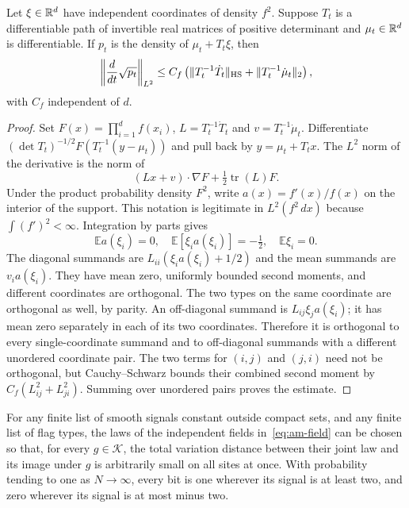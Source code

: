 \begin{lemma}\label{lem:am-density-speed}
Let $\xi\in\mathbb R^d$ have independent coordinates of density $f^2$.  Suppose
$T_t$ is a differentiable path of invertible real matrices of positive
determinant and $\mu_t\in\mathbb R^d$ is differentiable.  If $p_t$ is the density
of $\mu_t+T_t\xi$, then
\[
 \left\|\frac{d}{dt}\sqrt{p_t}\right\|_{L^2}
 \le C_f\left(\|T_t^{-1}\dot T_t\|_{\mathrm{HS}}
                  +\|T_t^{-1}\dot\mu_t\|_2\right),
\]
with $C_f$ independent of $d$.
\end{lemma}

\begin{proof}
Set $F(x)=\prod_{i=1}^d f(x_i)$,
$L=T_t^{-1}\dot T_t$ and $v=T_t^{-1}\dot\mu_t$.
Differentiate
$(\det T_t)^{-1/2}F(T_t^{-1}(y-\mu_t))$ and pull back by $y=\mu_t+T_tx$.
The $L^2$ norm of the derivative is the norm of
\[
 (Lx+v)\cdot\nabla F+\tfrac12\operatorname{tr}(L)F.
\]
Under the product probability density $F^2$, write
$a(x)=f'(x)/f(x)$ on the interior of the support.  This notation is
legitimate in $L^2(f^2\,dx)$ because $\int(f')^2<\infty$.
Integration by parts gives
\[
 \mathbb E a(\xi_i)=0,\quad
 \mathbb E[\xi_i a(\xi_i)]=-\tfrac12,\quad
 \mathbb E\xi_i=0.
\]
The diagonal summands are
$L_{ii}(\xi_i a(\xi_i)+1/2)$ and the mean summands are $v_i a(\xi_i)$.
They have mean zero, uniformly bounded second moments, and different
coordinates are orthogonal.  The two types on the same coordinate are
orthogonal as well, by parity.  An off-diagonal summand is
$L_{ij}\xi_j a(\xi_i)$; it has mean zero separately in each of its two
coordinates.  Therefore it is orthogonal to every single-coordinate
summand and to off-diagonal summands with a different unordered coordinate
pair.  The two terms for $(i,j)$ and $(j,i)$ need not be orthogonal, but
Cauchy--Schwarz bounds their combined second moment by
$C_f(L_{ij}^2+L_{ji}^2)$.  Summing over unordered pairs proves the estimate.
\end{proof}

\begin{proposition}\label{prop:am-field-covariance}
For any finite list of smooth signals constant outside compact sets, and any
finite list of flag types, the laws of the independent fields
in~\eqref{eq:am-field} can be chosen so that, for every $g\in\mathcal K$,
the total variation distance between their joint law and its image under
$g$ is arbitrarily small on all sites at once.  With probability tending
to one as $N\to\infty$, every bit is one wherever its signal is at least
two, and zero wherever its signal is at most minus two.
\end{proposition}

